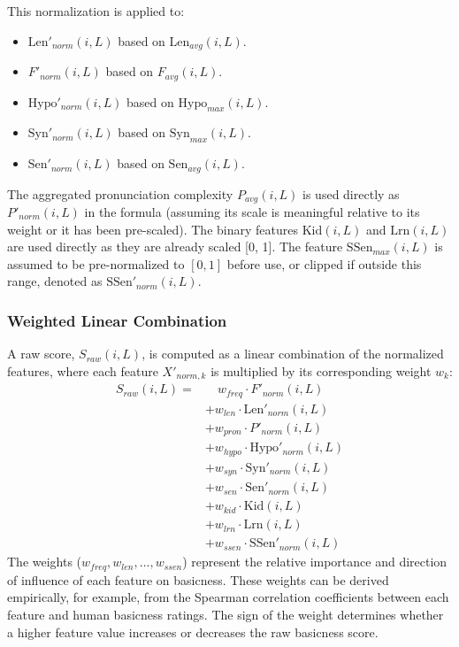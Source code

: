 \documentclass[preprint,12pt,authoryear]{elsarticle}
\begin{document}
This normalization is applied to:
\begin{itemize}
    \item $\text{Len}'_{norm}(i, L)$ based on $\text{Len}_{avg}(i, L)$.
    \item $F'_{norm}(i, L)$ based on $F_{avg}(i, L)$.
    \item $\text{Hypo}'_{norm}(i, L)$ based on $\text{Hypo}_{max}(i, L)$.
    \item $\text{Syn}'_{norm}(i, L)$ based on $\text{Syn}_{max}(i, L)$.
    \item $\text{Sen}'_{norm}(i, L)$ based on $\text{Sen}_{avg}(i, L)$.
\end{itemize}
The aggregated pronunciation complexity $P_{avg}(i, L)$ is used directly as $P'_{norm}(i, L)$ in the formula (assuming its scale is meaningful relative to its weight or it has been pre-scaled). The binary features $\text{Kid}(i, L)$ and $\text{Lrn}(i, L)$ are used directly as they are already scaled [0, 1]. The feature $\text{SSen}_{max}(i, L)$ is assumed to be pre-normalized to $[0, 1]$ before use, or clipped if outside this range, denoted as $\text{SSen}'_{norm}(i, L)$.

\subsubsection{Weighted Linear Combination}
\label{sec:weighted_linear_combination}
A raw score, $S_{raw}(i, L)$, is computed as a linear combination of the normalized features, where each feature $X'_{norm, k}$ is multiplied by its corresponding weight $w_k$:
\begin{align*} \label{eq:raw_score}
S_{raw}(i, L) = & \quad w_{freq} \cdot F'_{norm}(i, L) \\
             & + w_{len} \cdot \text{Len}'_{norm}(i, L) \\
             & + w_{pron} \cdot P'_{norm}(i, L) \\
             & + w_{hypo} \cdot \text{Hypo}'_{norm}(i, L) \\
             & + w_{syn} \cdot \text{Syn}'_{norm}(i, L) \\
             & + w_{sen} \cdot \text{Sen}'_{norm}(i, L) \\
             & + w_{kid} \cdot \text{Kid}(i, L) \\
             & + w_{lrn} \cdot \text{Lrn}(i, L) \\
             & + w_{ssen} \cdot \text{SSen}'_{norm}(i, L)
\end{align*}
The weights ($w_{freq}, w_{len}, \ldots, w_{ssen}$) represent the relative importance and direction of influence of each feature on basicness. These weights can be derived empirically, for example, from the Spearman correlation coefficients between each feature and human basicness ratings. The sign of the weight determines whether a higher feature value increases or decreases the raw basicness score.
\end{document}
